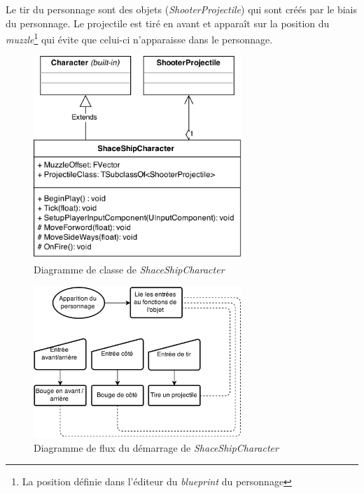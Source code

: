 \documentclass[11pt, a4paper, oneside]{article}
\begin{document}
Le tir du personnage sont des objets (\emph{ShooterProjectile}) qui sont créés par le biais du personnage. Le projectile est tiré en avant et apparaît sur la position du \emph{muzzle}\footnote{La position définie dans l'éditeur du \emph{blueprint} du personnage} qui évite que celui-ci n'apparaisse dans le personnage. \\[2cm]

\begin{figure}[p]
	\begin{center}
	\includegraphics[width=0.7\textwidth]{ShaceShipCharacter}
	\caption{Diagramme de classe de \emph{ShaceShipCharacter}}
	\label{fig:shaceshipcharacter}
	\end{center}
\end{figure}

\begin{figure}[p]
	\begin{center}
	\includegraphics[width=0.7\textwidth]{ShaceShipCharacterFlow}
	\caption{Diagramme de flux du démarrage de \emph{ShaceShipCharacter}}
	\label{fig:shaceshipcharacterflow}
	\end{center}
\end{figure}
\end{document}
